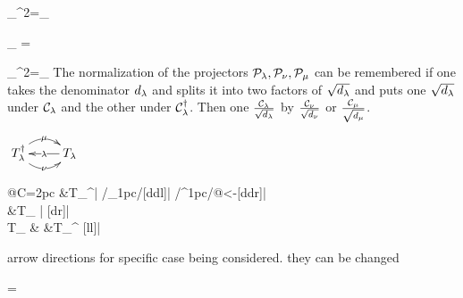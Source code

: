 \beq
\calp_\nu^2=\calp_\nu
\eeq



\beq
{\color{green}\calp_\mu}
=
\bcen
{}
\ecen
\eeq

\beq
\calp_\mu^2=\calp_\mu
\eeq
The normalization of the projectors ${\cal P}_\lambda, {\cal P}_\nu, {\cal P}_\mu$ can be remembered if 
one takes the denominator $d_\lambda$ and splits it into two factors of $\sqrt{d_\lambda}$
and puts one $\sqrt{d_\lambda}$
under ${\cal C}_\lambda$
and the other under ${\cal C}^\dagger_\lambda$. Then
one  $\frac{{\cal C}_\lambda}{\sqrt{d_\lambda}}$
by
$\frac{{\cal C}_\nu}{\sqrt{d_\nu}}$
or
$\frac{{\cal C}_\mu}{\sqrt{d_\mu}}$.


\newcommand{\trij}[3]{
\xymatrix{
T_#2^\dagger
\ar@/^1pc/[r]|#1
\ar@/_1pc/[r]|#3
&T_#2\ar[l]|#2
}
}

$
\trij{\mu}{\lam}{\nu}
$

\newcommand{\kten}[3]{
K\indices{
_#1^#2^#3}
}

\newcommand{\sixj}[6]{
\xymatrix@R=2pc@C=2pc{
&T_#5^\dagger\ar[d]|#1
\ar@/_1pc/[ddl]|#6
\ar@/^1pc/@{<-}[ddr]|#5
\\
&T_#2
\ar[dl]|#2
\ar@{<-}[dr]|#3
\\
T_#4
&
&T_#4^\dagger
\ar@{<-}[ll]|#4
}
}

\sixj{\lam}{\mu}{\nu}{\omega}{\rho}{\s}

arrow directions 
for specific case being
considered.
they can be changed

\beq
\bcen
{}
\ecen
=
{\sqrt{
\kten{\lam}{\nu}{\mu}
}}
\bcen
{}
\ecen
\eeq

\beq
\bcen
{}
\ecen
\neq
\bcen
{}
\ecen
\eeq


